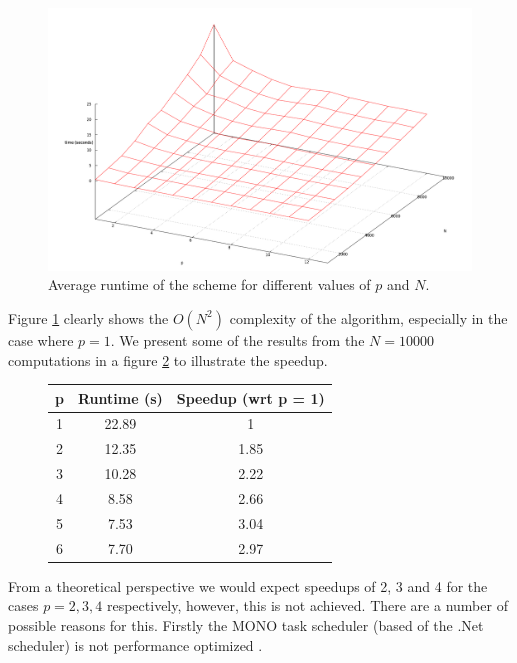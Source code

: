 \begin{figure}[H]
\includegraphics[scale = 0.3]{images/Dot_Net_Performance_No_Label}
\caption{Average runtime of the scheme for different values of $ p $ and $ N $. }
\label{fig:mono_performance_surface}
\end{figure}

Figure \ref{fig:mono_performance_surface} clearly shows the $ O(N^2) $ complexity of the algorithm, especially in the case where $ p = 1 $. 
We present some of the results from the $ N = 10000 $ computations in a figure \ref{tab:mono_speedup} to illustrate the speedup. 
\begin{figure}[h]
\label{tab:mono_speedup}
\begin{tabular}[ht]{|c|c|c|}
\hline
p       & Runtime (s)   & Speedup (wrt p = 1)\\ \hline
1       & 22.89         & 1  \\ \hline
2       & 12.35         & 1.85 \\ \hline
3       & 10.28         & 2.22 \\ \hline
4       & 8.58          & 2.66 \\ \hline
5       & 7.53          & 3.04 \\ \hline
6       & 7.70          & 2.97 \\ \hline
\end{tabular}
\end{figure}

From a theoretical perspective we would expect speedups of 2, 3 and 4 for the cases $ p =2,3, 4 $ respectively, however, this is not achieved. There are a number of possible reasons for this. Firstly the MONO task scheduler (based of the .Net scheduler) is not performance optimized \cite{MicrosoftTaskSchedular}.

